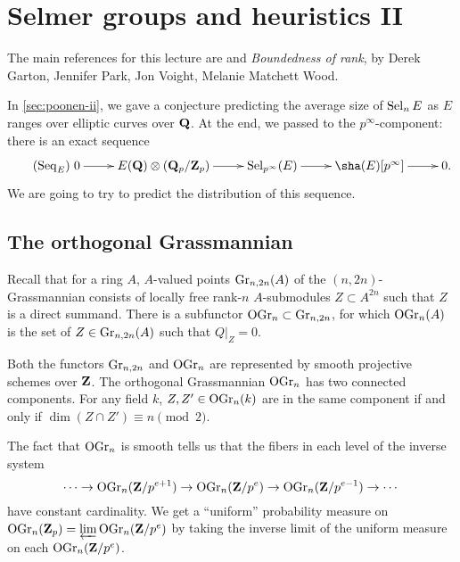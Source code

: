 
\section{Selmer groups and heuristics II}\label{sec:poonen-iii}





The main references for this lecture are \cite{bklpr13} and 
\emph{Boundedness of rank}, by Derek Garton, Jennifer Park, Jon Voight, 
Melanie Matchett Wood. 

In \autoref{sec:poonen-ii}, we gave a conjecture predicting the average size of 
$\operatorname{Sel}_n E$ as $E$ ranges over elliptic curves over $\mathbf{Q}$. At the end, we 
passed to the $p^\infty$-component: there is an exact sequence 
\begin{equation*}\tag{$\sequence_E$}\label{eq:seq-E}
\xymatrix{
  0 \ar[r] 
    & E(\dQ)\otimes (\dQ_p/\dZ_p) \ar[r] 
    & \selmer_{p^\infty}(E) \ar[r] 
    & \sha(E)[p^\infty] \ar[r] 
    & 0 .
}
\end{equation*}
We are going to try to predict the distribution of this sequence. 





\subsection{The orthogonal Grassmannian}

Recall that for a ring $A$, $A$-valued points $\operatorname{Gr}_{n,2n}(A)$ of 
the $(n,2n)$-Grassmannian consists of locally free rank-$n$ $A$-submodules 
$Z\subset A^{2n}$ such that $Z$ is a direct summand. There is a subfunctor 
$\operatorname{OGr}_n\subset \operatorname{Gr}_{n,2n}$, for which 
$\operatorname{OGr}_n(A)$ is the set of $Z\in \operatorname{Gr}_{n,2n}(A)$ 
such that $Q|_Z=0$. 

Both the functors $\operatorname{Gr}_{n,2n}$ and $\operatorname{OGr}_n$ are 
represented by smooth projective schemes over $\mathbf{Z}$. The orthogonal 
Grassmannian $\operatorname{OGr}_n$ has two connected components. For 
any field $k$, $Z,Z'\in \operatorname{OGr}_n(k)$ are in the same component 
if and only if $\dim(Z\cap Z')\equiv n\pmod 2$. 

The fact that $\operatorname{OGr}_n$ is smooth tells us that the fibers in 
each level of the inverse system 
\[
  \cdots \to \operatorname{OGr}_n(\mathbf{Z}/p^{e+1}) \to \operatorname{OGr}_n(\mathbf{Z}/p^e) \to \operatorname{OGr}_n(\mathbf{Z}/p^{e-1}) \to \cdots 
\]
have constant cardinality. We get a ``uniform'' probability measure on 
$\operatorname{OGr}_n(\mathbf{Z}_p)=\varprojlim\operatorname{OGr}_n(\mathbf{Z}/p^e)$ 
by taking the inverse limit of the uniform measure on each 
$\operatorname{OGr}_n(\mathbf{Z}/p^e)$. 





